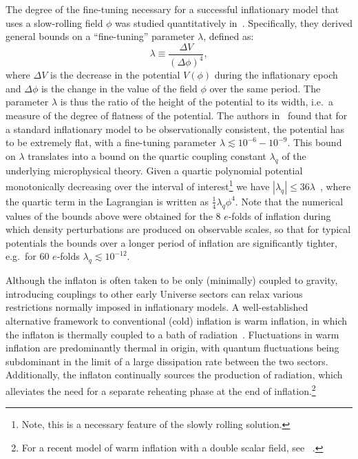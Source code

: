 The degree of the fine-tuning necessary for a successful  inflationary model that uses a slow-rolling field $\phi$ was studied quantitatively in~\citep{Adams:1990pn}. Specifically, they derived general bounds on a ``fine-tuning'' parameter $\lambda$, defined as:
\begin{equation}
    \lambda \equiv \frac{\Delta V}{(\Delta \phi)^4}, \label{eq:ch2-1.1}
\end{equation}
where $\Delta V$ is the decrease in the potential $V(\phi)$ during the inflationary epoch and $\Delta \phi$ is the change in the value of the field $\phi$ over the same period. The parameter $\lambda$ is thus the ratio of the height of the potential to its width, i.e.\ a measure of the degree of flatness of the potential. The authors in~\citep{Adams:1990pn} found that for a standard inflationary model to be observationally consistent, the potential has to be extremely flat, with a fine-tuning parameter $\lambda\lesssim 10^{-6}-10^{-9}$. This bound on $\lambda$ translates into a bound on the quartic coupling constant $\lambda_q$ of the underlying microphysical theory. Given a quartic polynomial potential monotonically decreasing over the interval of interest\footnote{Note, this is a necessary feature of the slowly rolling solution.} we have $|\lambda_q|\leq 36 \lambda$~\citep{Adams:1990pn}, where the quartic term in the Lagrangian is written as $\frac{1}{4}\lambda_q\phi^4$. Note that the numerical values of the bounds above were obtained for the 8 $e$-folds of inflation during which density perturbations are produced on observable scales, so that for typical potentials the bounds over a longer period of inflation are significantly tighter, e.g.\ for 60 $e$-folds $\lambda_q\lesssim 10^{-12}$.

Although the inflaton is often taken to be only (minimally) coupled to gravity, introducing couplings to other early Universe sectors can relax various restrictions normally imposed in inflationary models. A well-established alternative framework to conventional (cold) inflation is warm inflation, in which the inflaton is thermally coupled to a bath of radiation~\citep{Berera:1995ie,Berera:1995wh, Berera:1996fm}. Fluctuations in warm inflation are predominantly thermal in origin, with quantum fluctuations being subdominant in the limit of a large dissipation rate between the two sectors. Additionally, the inflaton continually sources the production of radiation, which alleviates the need for a separate reheating phase at the end of inflation.\footnote{For a recent model of warm inflation with a double scalar field, see ~\citep{DAgostino:2021vvv}.}

